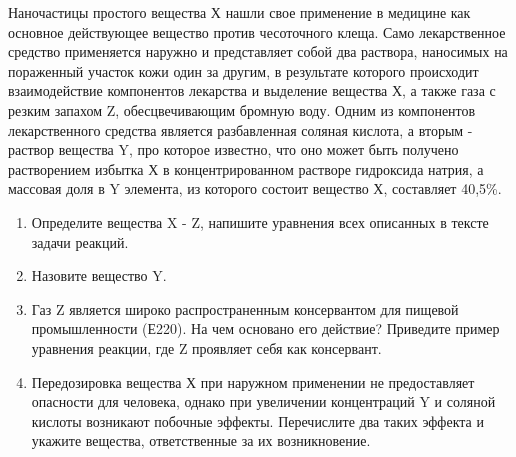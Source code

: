 
Наночастицы простого вещества Х нашли свое применение в медицине как основное действующее вещество против 
чесоточного клеща. Само лекарственное средство применяется наружно и представляет собой два раствора, наносимых 
на пораженный участок кожи один за другим, в результате которого происходит взаимодействие компонентов лекарства 
и выделение вещества Х, а также газа с резким запахом Z, обесцвечивающим бромную воду. Одним из компонентов 
лекарственного средства является разбавленная соляная кислота, а вторым - раствор вещества Y, про которое 
известно, что оно может быть получено растворением избытка Х в концентрированном растворе гидроксида натрия,  
а массовая доля в Y элемента, из которого состоит вещество Х, составляет 40,5\%.

\begin{enumerate}
    \item Определите вещества X - Z, напишите уравнения всех описанных в тексте задачи реакций.
    \item Назовите вещество Y.
    \item Газ Z является широко распространенным консервантом для пищевой промышленности (Е220). На чем основано его действие? 
    Приведите пример уравнения реакции, где Z проявляет себя как консервант.    
    \item Передозировка вещества Х при наружном применении не предоставляет опасности для человека, 
    однако при увеличении концентраций Y и соляной кислоты возникают побочные эффекты. Перечислите два 
    таких эффекта и укажите вещества, ответственные за их возникновение. 
\end{enumerate}

